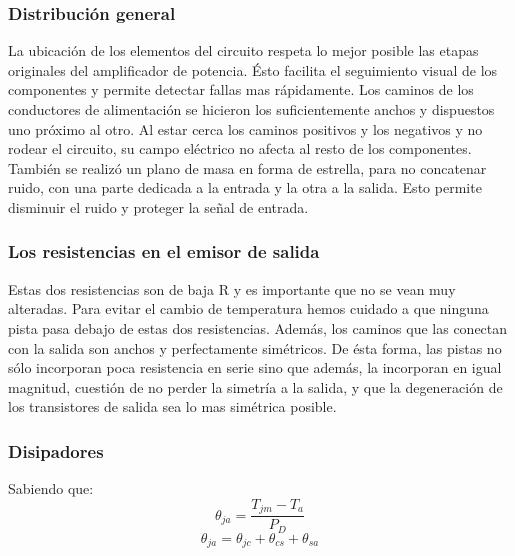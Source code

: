
\subsubsection*{Distribución general}
La ubicación de los elementos del circuito respeta lo mejor posible las etapas originales del amplificador de potencia. Ésto facilita el seguimiento visual de los componentes y permite detectar fallas mas rápidamente.
Los caminos de los conductores de alimentación se hicieron los suficientemente anchos y dispuestos uno próximo al otro. Al estar cerca los caminos positivos y los negativos y no rodear el circuito, su campo eléctrico no afecta al resto de los componentes.
También se realizó un plano de masa en forma de estrella, para no concatenar ruido, con una parte dedicada a la entrada y la otra a la salida. Esto permite disminuir el ruido y proteger la señal de entrada.


\subsubsection*{Los resistencias en el emisor de salida}
Estas dos resistencias son de baja R y es importante que no se vean muy alteradas. Para evitar el cambio de temperatura hemos cuidado a que ninguna pista pasa debajo de estas dos resistencias. Además, los caminos que las conectan con la salida son anchos y perfectamente simétricos. De ésta forma, las pistas no sólo incorporan poca resistencia en serie sino que además, la incorporan en igual magnitud, cuestión de no perder la simetría a la salida, y que la degeneración de los transistores de salida sea lo mas simétrica posible.


\subsubsection{Disipadores}
\bigskip
Sabiendo que:
$$
   \theta_{ja}=\dfrac{T_{jm}-T_a}{P_D}
$$
$$
	\theta_{ja}=\theta_{jc}+\theta_{cs}+\theta_{sa}
$$

